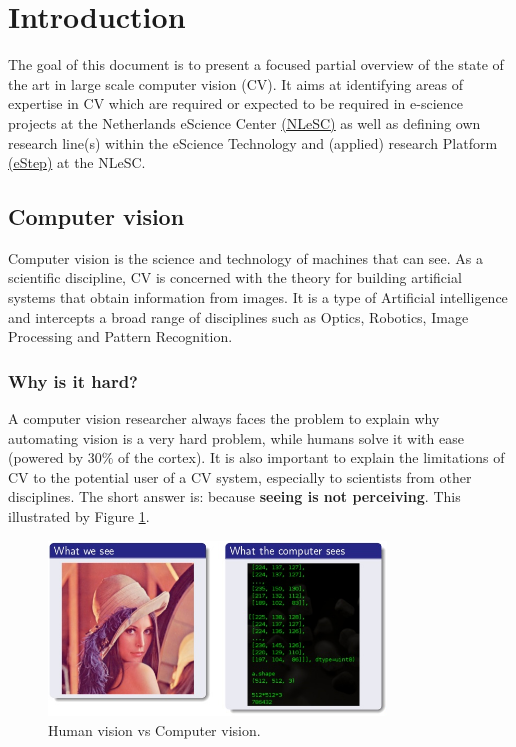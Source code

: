 \section{Introduction}
\label{sec:intro}
  
The goal of this document is to present a focused partial overview of the state of the art in large scale computer vision (CV).  It aims at identifying areas of expertise in CV which are required or expected to be required in e-science projects at the Netherlands eScience Center \href{https://www.esciencecenter.nl/}{\underline{(NLeSC)}} as well as defining own research line(s) within the eScience Technology and (applied) research Platform \href{https://www.esciencecenter.nl/site/project/estep}{(\underline{eStep})} at the NLeSC.

\subsection{Computer vision}

Computer vision is the science and technology of machines that can see. As a scientific discipline, CV is concerned with the theory for building artificial systems that obtain information from images. It is a type of Artificial intelligence and intercepts a broad range of disciplines such as Optics, Robotics, Image Processing and Pattern Recognition. 

\subsubsection{Why is it hard?}
A computer vision researcher always faces the problem to explain why automating vision is a very hard problem, while humans solve it with ease (powered by $30\%$ of the cortex). It is also important to explain the limitations of CV to the potential user of a CV system, especially to scientists from other disciplines. The short answer is: because {\bf seeing is not perceiving}. This illustrated by Figure \ref{fig:CV}.
\begin{figure}[H]
\begin{center}
\includegraphics[width=0.8\textwidth]{fig/ManVsPC}
\end{center}
\caption{Human vision vs Computer vision.}
\label{fig:CV}
\end{figure}

